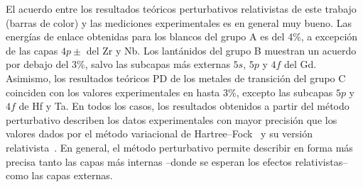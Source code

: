 El acuerdo entre los resultados teóricos perturbativos relativistas de 
este trabajo (barras de color) y las mediciones experimentales es en 
general muy bueno. Las energías de enlace obtenidas para los blancos del 
grupo A es del 4\%, a excepción de las capas $4p\pm$ del Zr y Nb. Los 
lantánidos del grupo B muestran un acuerdo por debajo del 3\%, salvo las 
subcapas más externas $5s$, $5p$ y $4f$ del Gd. Asimismo, los resultados 
teóricos PD de los metales de transición del grupo C coinciden con los 
valores experimentales en hasta 3\%, excepto las subcapas $5p$ y $4f$ de 
Hf y Ta. En todos los casos, los resultados obtenidos a partir del 
método perturbativo describen los datos experimentales con mayor 
precisión que los valores dados por el método variacional de 
Hartree--Fock~\cite{FroeseFischer:97} y su versión 
relativista~\cite{Desclaux:73}. En general, el método perturbativo 
permite describir en forma más precisa tanto las capas más internas 
--donde se esperan los efectos relativistas-- como las capas externas.

